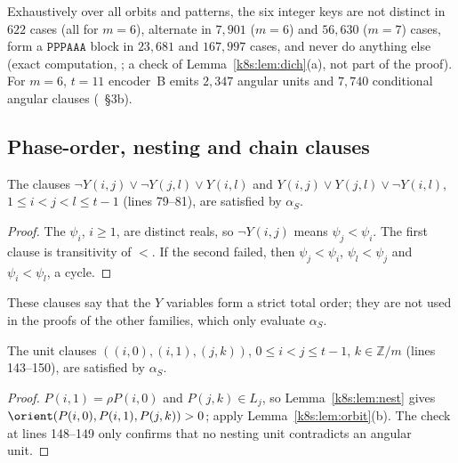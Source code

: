 Exhaustively over all orbits and patterns, the six integer keys are not distinct in $622$ cases (all for $m=6$),
alternate in $7{,}901$ ($m=6$) and $56{,}630$ ($m=7$) cases, form a $\mathtt{PPPAAA}$ block in $23{,}681$ and
$167{,}997$ cases, and never do anything else (exact computation, ; a check of
Lemma~\ref{k8s:lem:dich}(a), not part of the proof). For $m=6$, $t=11$ encoder~B emits $2{,}347$ angular units and
$7{,}740$ conditional angular clauses (~\S3b).

\subsection{Phase-order, nesting and chain clauses}\label{k8s:sec:other}

\begin{lemma}\label{k8s:lem:order}
The clauses $\neg Y(i,j)\vee\neg Y(j,l)\vee Y(i,l)$ and $Y(i,j)\vee Y(j,l)\vee\neg Y(i,l)$, $1\le i<j<l\le t-1$ (lines
79--81), are satisfied by $\alpha_S$.
\end{lemma}

\begin{proof}
The $\psi_i$, $i\ge1$, are distinct reals, so $\neg Y(i,j)$ means $\psi_j<\psi_i$. The first clause is transitivity of
$<$. If the second failed, then $\psi_j<\psi_i$, $\psi_l<\psi_j$ and $\psi_i<\psi_l$, a cycle.
\end{proof}

These clauses say that the $Y$ variables form a strict total order; they are not used in the proofs of the other
families, which only evaluate $\alpha_S$.

\begin{lemma}\label{k8s:lem:nestcl}
The unit clauses $((i,0),(i,1),(j,k))$, $0\le i<j\le t-1$, $k\in\mathbb Z/m$ (lines 143--150), are satisfied
by $\alpha_S$.
\end{lemma}

\begin{proof}
$P(i,1)=\rho P(i,0)$ and $P(j,k)\in L_j$, so Lemma~\ref{k8s:lem:nest} gives $\orient(P(i,0),P(i,1),P(j,k))>0$; apply
Lemma~\ref{k8s:lem:orbit}(b). The check at lines 148--149 only confirms that no nesting unit contradicts an angular
unit.
\end{proof}

